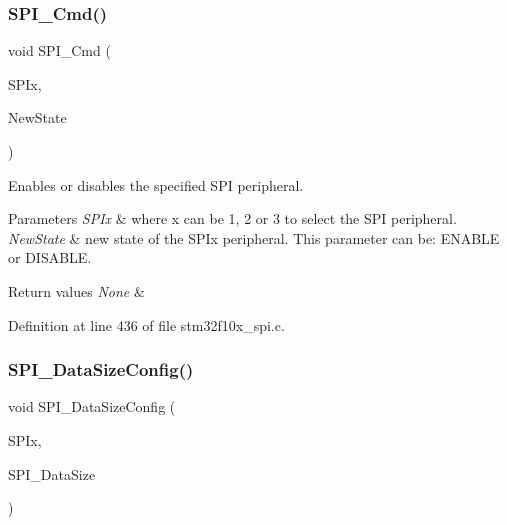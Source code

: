 \subsubsection{\texorpdfstring{S\+P\+I\+\_\+\+Cmd()}{SPI\_Cmd()}}
{\footnotesize\ttfamily void S\+P\+I\+\_\+\+Cmd (\begin{DoxyParamCaption}\item[{\hyperlink{struct_s_p_i___type_def}{S\+P\+I\+\_\+\+Type\+Def} $\ast$}]{S\+P\+Ix,  }\item[{\hyperlink{group___exported__types_gac9a7e9a35d2513ec15c3b537aaa4fba1}{Functional\+State}}]{New\+State }\end{DoxyParamCaption})}



Enables or disables the specified S\+PI peripheral. 


\begin{DoxyParams}{Parameters}
{\em S\+P\+Ix} & where x can be 1, 2 or 3 to select the S\+PI peripheral. \\
\hline
{\em New\+State} & new state of the S\+P\+Ix peripheral. This parameter can be\+: E\+N\+A\+B\+LE or D\+I\+S\+A\+B\+LE. \\
\hline
\end{DoxyParams}

\begin{DoxyRetVals}{Return values}
{\em None} & \\
\hline
\end{DoxyRetVals}


Definition at line 436 of file stm32f10x\+\_\+spi.\+c.

\mbox{\label{group___s_p_i___exported___functions_gafc82e90841d7879535d655c035709cb1}} 
\subsubsection{\texorpdfstring{S\+P\+I\+\_\+\+Data\+Size\+Config()}{SPI\_DataSizeConfig()}}
{\footnotesize\ttfamily void S\+P\+I\+\_\+\+Data\+Size\+Config (\begin{DoxyParamCaption}\item[{\hyperlink{struct_s_p_i___type_def}{S\+P\+I\+\_\+\+Type\+Def} $\ast$}]{S\+P\+Ix,  }\item[{uint16\+\_\+t}]{S\+P\+I\+\_\+\+Data\+Size }\end{DoxyParamCaption})}



